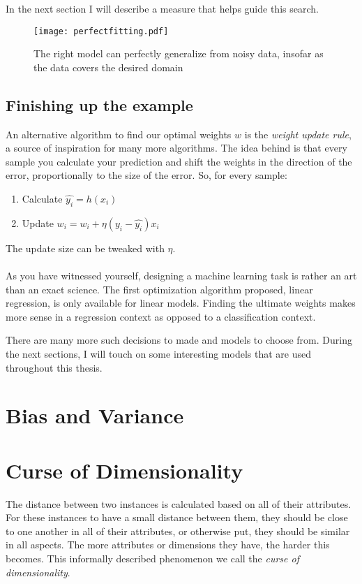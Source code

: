 In the next section I will describe a measure
that helps guide this search.

\begin{figure}[h]
\center
\texttt{[image: perfectfitting.pdf]}
\label{fig:perfectfitting}
\caption{The right model can perfectly generalize from noisy data,
insofar as the data covers the desired domain}
\end{figure}

\subsection{Finishing up the example}
An alternative algorithm to find our optimal weights $w$
is the \textit{weight update rule},
a source of inspiration for many more algorithms.
The idea behind is that every sample
you calculate your prediction
and shift the weights in the direction of the error,
proportionally to the size of the error.
So, for every sample:
\begin{enumerate}
\item Calculate $\hat{y_i} = h(x_i)$
\item Update $w_i = w_i + \eta(y_i - \hat{y_i})x_i$
\end{enumerate}

The update size can be tweaked with $\eta$.

\paragraph{}
As you have witnessed yourself,
designing a machine learning task
is rather an art than an exact science.
The first optimization algorithm proposed,
linear regression,
is only available for linear models.
Finding the ultimate weights
makes more sense in a regression context
as opposed to a classification context.

There are many more such decisions to made
and models to choose from.
During the next sections,
I will touch on some interesting
models that are used throughout this thesis.

\section{Bias and Variance}

\section{Curse of Dimensionality}
The distance between two instances is calculated based on all of their attributes.
For these instances to have a small distance between them,
they should be close to one another in all of their attributes,
or otherwise put,
they should be similar in all aspects.
The more attributes or dimensions they have,
the harder this becomes.
This informally described phenomenon we call
the \textit{curse of dimensionality}.


